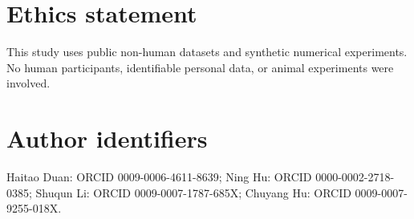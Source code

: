\documentclass[11pt]{article}
\begin{document}
\section*{Ethics statement}
This study uses public non-human datasets and synthetic numerical experiments. No human participants, identifiable personal data, or animal experiments were involved.

\section*{Author identifiers}
Haitao Duan: ORCID 0009-0006-4611-8639; Ning Hu: ORCID 0000-0002-2718-0385; Shuqun Li: ORCID 0009-0007-1787-685X; Chuyang Hu: ORCID 0009-0007-9255-018X.



\end{document}
